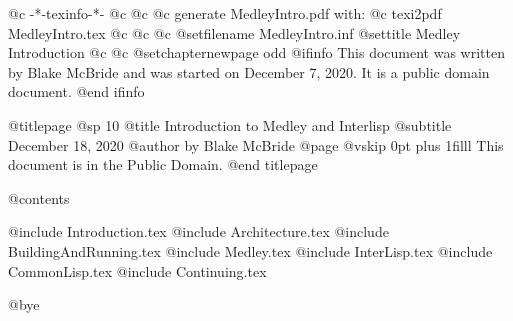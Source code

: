     @c -*-texinfo-*-
@c
@c
@c generate MedleyIntro.pdf with:
@c         texi2pdf MedleyIntro.tex
@c
@c
@c %
@setfilename MedleyIntro.inf
@settitle Medley Introduction
@c %
@c @setchapternewpage odd
@ifinfo
This document was written by Blake McBride and was started
on December 7, 2020.  It is a public domain document.
@end ifinfo

@titlepage
@sp 10
@title Introduction to Medley and Interlisp
@subtitle December 18, 2020
@author by Blake McBride
@page
@vskip 0pt plus 1filll
This document is in the Public Domain.
@end titlepage

@contents

@include Introduction.tex
@include Architecture.tex
@include BuildingAndRunning.tex
@include Medley.tex
@include InterLisp.tex
@include CommonLisp.tex
@include Continuing.tex

@bye


